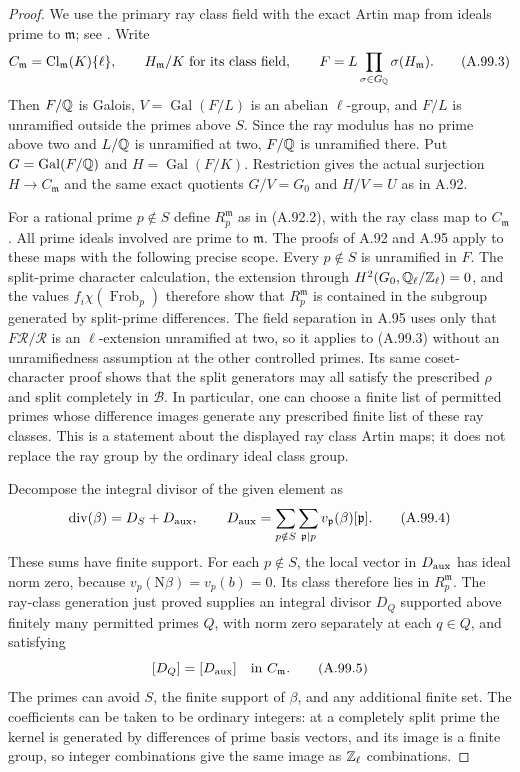\begin{proof}
We use the primary ray class field with the exact Artin
map from ideals prime to $\mathfrak m$; see
\cite[V, Theorems 3.5--3.6]{MilneCFT}.
Write
\[
 C_{\mathfrak m}=\operatorname{Cl}_{\mathfrak m}(K)\{\ell\},
 \qquad H_{\mathfrak m}/K\text{ for its class field},
 \qquad F=L\prod_{\sigma\in G_\mathbb Q}\sigma(H_{\mathfrak m}).
 \tag{A.99.3}
\]
Then $F/\mathbb Q$ is Galois,
$V=\operatorname{Gal}(F/L)$ is an abelian $\ell$-group,
and $F/L$ is unramified outside the primes above $S$.
Since the ray modulus has no prime above two and $L/\mathbb Q$
is unramified at two, $F/\mathbb Q$ is unramified there.
Put $G=\operatorname{Gal}(F/\mathbb Q)$ and
$H=\operatorname{Gal}(F/K)$.
Restriction gives the actual surjection
$H\to C_{\mathfrak m}$ and the same exact quotients
$G/V=G_0$ and $H/V=U$ as in A.92.

For a rational prime $p\notin S$ define
$R_p^{\mathfrak m}$ as in (A.92.2), with the ray class
map to $C_{\mathfrak m}$.
All prime ideals involved are prime to $\mathfrak m$.
The proofs of A.92 and A.95 apply to these maps with
the following precise scope.
Every $p\notin S$ is unramified in $F$.
The split-prime character calculation, the extension
through $H^2(G_0,\mathbb Q_\ell/\mathbb Z_\ell)=0$, and the values
$f_i\chi(\operatorname{Frob}_p)$ therefore show that
$R_p^{\mathfrak m}$ is contained in the subgroup
generated by split-prime differences.
The field separation in A.95 uses only that
$F\mathcal R/\mathcal R$ is an $\ell$-extension
unramified at two, so it applies to (A.99.3) without
an unramifiedness assumption at the other controlled
primes.
Its same coset-character proof shows that the split
generators may all satisfy the prescribed $\rho$ and
split completely in $\mathcal B$.
In particular, one can choose a finite list of permitted
primes whose difference images generate any prescribed
finite list of these ray classes.
This is a statement about the displayed ray class
Artin maps; it does not replace the ray group by the
ordinary ideal class group.

Decompose the integral divisor of the given element as
\[
 \operatorname{div}(\beta)=D_S+D_{\rm aux},
 \qquad
 D_{\rm aux}=\sum_{p\notin S}
                   \sum_{\mathfrak p\mid p}v_{\mathfrak p}(\beta)
                                                   [\mathfrak p].
 \tag{A.99.4}
\]
These sums have finite support.
For each $p\notin S$, the local vector in $D_{\rm aux}$
has ideal norm zero, because
$v_p(\mathrm N\beta)=v_p(b)=0$.
Its class therefore lies in $R_p^{\mathfrak m}$.
The ray-class generation just proved supplies an
integral divisor $D_Q$ supported above finitely many
permitted primes $Q$, with norm zero separately at
each $q\in Q$, and satisfying
\[
                    [D_Q]=[D_{\rm aux}]
                                      \quad\text{in }C_{\mathfrak m}.
 \tag{A.99.5}
\]
The primes can avoid $S$, the finite support of $\beta$,
and any additional finite set.
The coefficients can be taken to be ordinary integers:
at a completely split prime the kernel is generated
by differences of prime basis vectors, and its image
is a finite group, so integer combinations give the
same image as $\mathbb Z_\ell$ combinations.


\end{proof}
